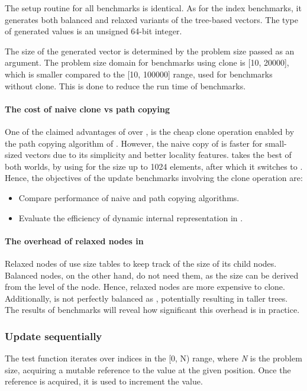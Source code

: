 The setup routine for all benchmarks is identical. As for the index benchmarks, it generates both balanced and relaxed variants of the tree-based vectors. The type of generated values is an unsigned 64-bit integer. 

The size of the generated vector is determined by the problem size passed as an argument. The problem size domain for benchmarks using clone is [10, 20000], which is smaller compared to the [10, 100000] range, used for benchmarks without clone. This is done to reduce the run time of benchmarks. 

\paragraph*{The cost of naive clone vs path copying}
One of the claimed advantages of \rbvec{} over \stdvec{}, is the cheap clone operation enabled by the path copying  algorithm of \rbtree{}. However, the naive copy of \stdvec{} is faster for small-sized vectors due to its simplicity and better locality features. \pvec{} takes the best of both worlds, by using \stdvec{} for the size up to 1024 elements, after which it switches to \rbvec{}. Hence, the objectives of the update benchmarks involving the clone operation are:
\begin{itemize}
    \item Compare performance of naive and path copying algorithms. 
    \item Evaluate the efficiency of dynamic internal representation in \pvec{}.  
\end{itemize}

\paragraph*{The overhead of relaxed nodes in \rrbtree{}}
Relaxed nodes of \rrbtree{} use size tables to keep track of the size of its child nodes. Balanced nodes, on the other hand, do not need them, as the size can be derived from the level of the node. Hence, relaxed nodes are more expensive to clone. Additionally, \rrbtree{} is not perfectly balanced as \rbtree{}, potentially resulting in taller trees. The results of benchmarks will reveal how significant this overhead is in practice. 

\subsubsection*{Update sequentially}
The test function iterates over indices in the [0, N) range, where \emph{N} is the problem size, acquiring a mutable reference to the value at the given position. Once the reference is acquired, it is used to increment the value. 

